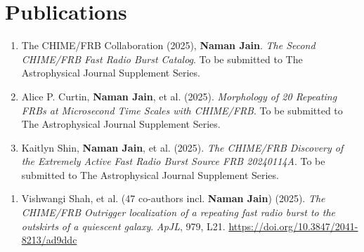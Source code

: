 \section{Publications}

\makeatletter
{}
\makeatother

\begin{enumerate}[leftmargin=*, label=\arabic*., start=1]
\end{enumerate}

\begin{enumerate}[leftmargin=*, label=\arabic*., resume]
  \item The CHIME/FRB Collaboration (2025), \textbf{Naman Jain}. \textit{The Second CHIME/FRB Fast Radio Burst Catalog}. To be submitted to The Astrophysical Journal Supplement Series.
  \item Alice P. Curtin, \textbf{Naman Jain}, et al. (2025). \textit{Morphology of 20 Repeating FRBs at Microsecond Time Scales with CHIME/FRB}. To be submitted to The Astrophysical Journal Supplement Series.
  \item Kaitlyn Shin, \textbf{Naman Jain}, et al. (2025). \textit{The CHIME/FRB Discovery of the Extremely Active Fast Radio Burst Source FRB 20240114A}. To be submitted to The Astrophysical Journal Supplement Series.
\end{enumerate}

\begin{enumerate}[leftmargin=*, label=\arabic*., resume]
  \item Vishwangi Shah, et al. (47 co-authors incl. \textbf{Naman Jain}) (2025). \textit{The CHIME/FRB Outrigger localization of a repeating fast radio burst to the outskirts of a quiescent galaxy}. \textit{ApJL}, 979, L21. \url{https://doi.org/10.3847/2041-8213/ad9ddc}
\end{enumerate}